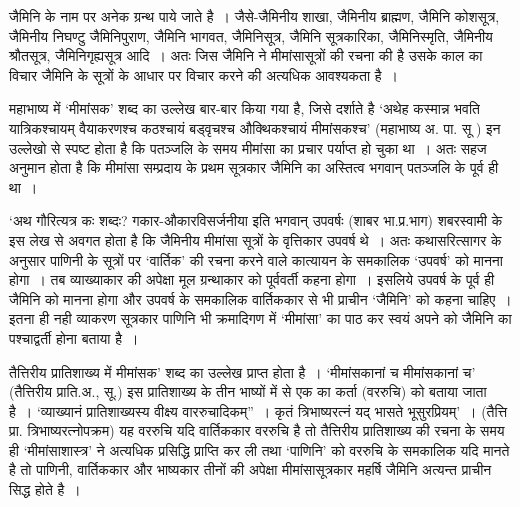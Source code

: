 जैमिनि के नाम पर अनेक ग्रन्थ पाये जाते है~। जैसे-जैमिनीय शाखा, जैमिनीय ब्राह्मण, जैमिनि कोशसूत्र, जैमिनीय निघण्टु जैमिनिपुराण, जैमिनि भागवत, जैमिनिसूत्र, जैमिनि सूत्रकारिका, जैमिनिस्मृति, जैमिनीय श्रौतसूत्र, जैमिनिगृह्यसूत्र आदि~। अतः जिस जैमिनि ने मीमांसासूत्रों की रचना की है उसके काल का विचार जैमिनि के सूत्रों के आधार पर विचार करने की अत्यधिक आवश्यकता है~। 

महाभाष्य में ‘मीमांसक' शब्द का उल्लेख बार-बार किया गया है, जिसे दर्शाते है ‘अथेह कस्मान्न भवति यात्रिकश्चायम् वैयाकरणश्च कठश्चायं बड्वृचश्च औक्थिकश्चायं मीमांसकश्च' (महाभाष्य अ. पा. सू ) इन उल्लेखो से स्पष्ट होता है कि पतञ्जलि के समय मीमांसा का प्रचार पर्याप्त हो चुका था~। अतः सहज अनुमान होता है कि मीमांसा सम्प्रदाय के प्रथम सूत्रकार जैमिनि का अस्तित्व भगवान् पतञ्जलि के पूर्व ही था~।

‘अथ गौरित्यत्र कः शब्दः? गकार-औकारविसर्जनीया इति भगवान् उपवर्षः (शाबर भा.प्र.भाग) शबरस्वामी के इस लेख से अवगत होता है कि जैमिनीय मीमांसा सूत्रों के वृत्तिकार उपवर्ष थे~। अतः कथासरित्सागर के अनुसार पाणिनी के सूत्रों पर ‘वार्तिक' की रचना करने वाले कात्यायन के समकालिक ‘उपवर्ष' को मानना होगा~। तब व्याख्याकार की अपेक्षा मूल ग्रन्थाकार को पूर्ववर्ती कहना होगा~। इसलिये उपवर्ष के पूर्व ही जैमिनि को मानना होगा और उपवर्ष के समकालिक वार्तिककार से भी प्राचीन ‘जैमिनि' को कहना चाहिए~। इतना ही नही व्याकरण सूत्रकार पाणिनि भी क्रमादिगण में ‘मीमांसा' का पाठ कर स्वयं अपने को जैमिनि का पश्चाद्वर्ती होना बताया है~।

तैत्तिरीय प्रातिशाख्य में मीमांसक' शब्द का उल्लेख प्राप्त होता है~। ‘मीमांसकानां च मीमांसकानां च' (तैत्तिरीय प्राति.अ., सू.) इस प्रातिशाख्य के तीन भाष्यों में से एक का कर्ता (वररुचि) को बताया जाता है~। ‘व्याख्यानं प्रातिशाख्यस्य वीक्ष्य वाररुचादिकम्”~। कृतं त्रिभाष्यरत्नं यद् भासते भूसुरप्रियम्'~। (तैत्ति प्रा. त्रिभाष्यरत्नोपक्रम) यह वररुचि यदि वार्तिककार वररुचि है तो तैत्तिरीय प्रातिशाख्य की रचना के समय ही ‘मीमांसाशास्त्र' ने अत्यधिक प्रसिद्धि प्राप्ति कर ली तथा ‘पाणिनि' को वररुचि के समकालिक यदि मानते है तो पाणिनी, वार्तिककार और भाष्यकार तीनों की अपेक्षा मीमांसासूत्रकार महर्षि जैमिनि अत्यन्त प्राचीन सिद्ध होते है~।

